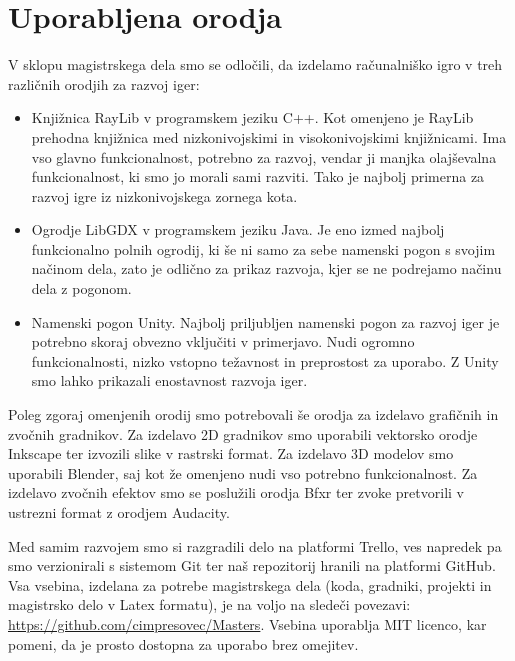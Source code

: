 \documentclass[12pt,a4paper,twoside]{book}
\begin{document}
\section{Uporabljena orodja}
V sklopu magistrskega dela smo se odločili, da izdelamo računalniško igro v treh različnih orodjih za razvoj iger:
\begin{itemize}
	\item Knjižnica RayLib v programskem jeziku C++. Kot omenjeno je RayLib prehodna knjižnica med nizkonivojskimi in visokonivojskimi knjižnicami. Ima vso glavno funkcionalnost, potrebno za razvoj, vendar ji manjka olajševalna funkcionalnost, ki smo jo morali sami razviti. Tako je najbolj primerna za razvoj igre iz nizkonivojskega zornega kota.
	\item Ogrodje LibGDX v programskem jeziku Java. Je eno izmed najbolj funkcionalno polnih ogrodij, ki še ni samo za sebe namenski pogon s svojim načinom dela, zato je odlično za prikaz razvoja, kjer se ne podrejamo načinu dela z pogonom.
	\item Namenski pogon Unity. Najbolj priljubljen namenski pogon za razvoj iger je potrebno skoraj obvezno vključiti v primerjavo. Nudi ogromno funkcionalnosti, nizko vstopno težavnost in preprostost za uporabo. Z Unity smo lahko prikazali enostavnost razvoja iger.
\end{itemize}

Poleg zgoraj omenjenih orodij smo potrebovali še orodja za izdelavo grafičnih in zvočnih gradnikov. Za izdelavo 2D gradnikov smo uporabili vektorsko orodje Inkscape ter izvozili slike v rastrski format. Za izdelavo 3D modelov smo uporabili Blender, saj kot že omenjeno nudi vso potrebno funkcionalnost. Za izdelavo zvočnih efektov smo se poslužili orodja Bfxr ter zvoke pretvorili v ustrezni format z orodjem Audacity.

Med samim razvojem smo si razgradili delo na platformi Trello, ves napredek pa smo verzionirali s sistemom Git ter naš repozitorij hranili na platformi GitHub. Vsa vsebina, izdelana za potrebe magistrskega dela (koda, gradniki, projekti in magistrsko delo v Latex formatu), je na voljo na sledeči povezavi: \url{https://github.com/cimpresovec/Masters}. Vsebina uporablja MIT licenco, kar pomeni, da je prosto dostopna za uporabo brez omejitev.
\end{document}
